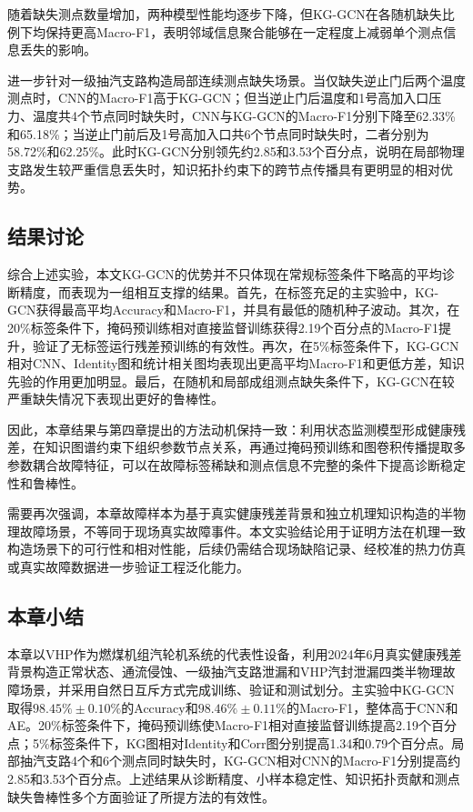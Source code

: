 随着缺失测点数量增加，两种模型性能均逐步下降，但KG-GCN在各随机缺失比例下均保持更高Macro-F1，表明邻域信息聚合能够在一定程度上减弱单个测点信息丢失的影响。

进一步针对一级抽汽支路构造局部连续测点缺失场景。当仅缺失逆止门后两个温度测点时，CNN的Macro-F1高于KG-GCN；但当逆止门后温度和1号高加入口压力、温度共4个节点同时缺失时，CNN与KG-GCN的Macro-F1分别下降至62.33\%和65.18\%；当逆止门前后及1号高加入口共6个节点同时缺失时，二者分别为58.72\%和62.25\%。此时KG-GCN分别领先约2.85和3.53个百分点，说明在局部物理支路发生较严重信息丢失时，知识拓扑约束下的跨节点传播具有更明显的相对优势。

\subsection{结果讨论}

综合上述实验，本文KG-GCN的优势并不只体现在常规标签条件下略高的平均诊断精度，而表现为一组相互支撑的结果。首先，在标签充足的主实验中，KG-GCN获得最高平均Accuracy和Macro-F1，并具有最低的随机种子波动。其次，在20\%标签条件下，掩码预训练相对直接监督训练获得2.19个百分点的Macro-F1提升，验证了无标签运行残差预训练的有效性。再次，在5\%标签条件下，KG-GCN相对CNN、Identity图和统计相关图均表现出更高平均Macro-F1和更低方差，知识先验的作用更加明显。最后，在随机和局部成组测点缺失条件下，KG-GCN在较严重缺失情况下表现出更好的鲁棒性。

因此，本章结果与第四章提出的方法动机保持一致：利用状态监测模型形成健康残差，在知识图谱约束下组织参数节点关系，再通过掩码预训练和图卷积传播提取多参数耦合故障特征，可以在故障标签稀缺和测点信息不完整的条件下提高诊断稳定性和鲁棒性。

需要再次强调，本章故障样本为基于真实健康残差背景和独立机理知识构造的半物理故障场景，不等同于现场真实故障事件。本文实验结论用于证明方法在机理一致构造场景下的可行性和相对性能，后续仍需结合现场缺陷记录、经校准的热力仿真或真实故障数据进一步验证工程泛化能力。

\subsection{本章小结}

本章以VHP作为燃煤机组汽轮机系统的代表性设备，利用2024年6月真实健康残差背景构造正常状态、通流侵蚀、一级抽汽支路泄漏和VHP汽封泄漏四类半物理故障场景，并采用自然日互斥方式完成训练、验证和测试划分。主实验中KG-GCN取得$98.45\%\pm0.10\%$的Accuracy和$98.46\%\pm0.11\%$的Macro-F1，整体高于CNN和AE。20\%标签条件下，掩码预训练使Macro-F1相对直接监督训练提高2.19个百分点；5\%标签条件下，KG图相对Identity和Corr图分别提高1.34和0.79个百分点。局部抽汽支路4个和6个测点同时缺失时，KG-GCN相对CNN的Macro-F1分别提高约2.85和3.53个百分点。上述结果从诊断精度、小样本稳定性、知识拓扑贡献和测点缺失鲁棒性多个方面验证了所提方法的有效性。
